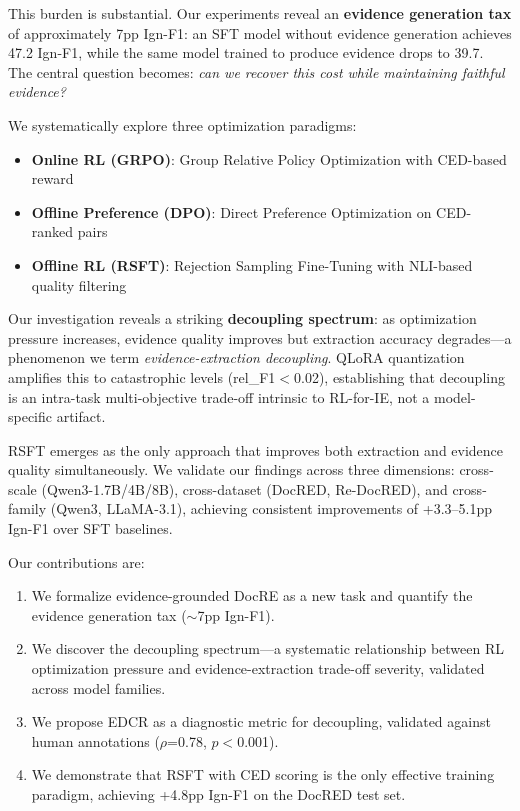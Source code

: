 \documentclass[11pt]{article}
\begin{document}
This burden is substantial. Our experiments reveal an \textbf{evidence generation tax} of approximately 7pp Ign-F1: an SFT model without evidence generation achieves 47.2 Ign-F1, while the same model trained to produce evidence drops to 39.7. The central question becomes: \emph{can we recover this cost while maintaining faithful evidence?}

We systematically explore three optimization paradigms:
\begin{itemize}
\item \textbf{Online RL (GRPO)}: Group Relative Policy Optimization with CED-based reward
\item \textbf{Offline Preference (DPO)}: Direct Preference Optimization on CED-ranked pairs
\item \textbf{Offline RL (RSFT)}: Rejection Sampling Fine-Tuning with NLI-based quality filtering
\end{itemize}

Our investigation reveals a striking \textbf{decoupling spectrum}: as optimization pressure increases, evidence quality improves but extraction accuracy degrades---a phenomenon we term \emph{evidence-extraction decoupling}. QLoRA quantization amplifies this to catastrophic levels (rel\_F1$<$0.02), establishing that decoupling is an intra-task multi-objective trade-off intrinsic to RL-for-IE, not a model-specific artifact.

RSFT emerges as the only approach that improves both extraction and evidence quality simultaneously. We validate our findings across three dimensions: cross-scale (Qwen3-1.7B/4B/8B), cross-dataset (DocRED, Re-DocRED), and cross-family (Qwen3, LLaMA-3.1), achieving consistent improvements of +3.3--5.1pp Ign-F1 over SFT baselines.

Our contributions are:
\begin{enumerate}
\item We formalize evidence-grounded DocRE as a new task and quantify the evidence generation tax ($\sim$7pp Ign-F1).
\item We discover the decoupling spectrum---a systematic relationship between RL optimization pressure and evidence-extraction trade-off severity, validated across model families.
\item We propose EDCR as a diagnostic metric for decoupling, validated against human annotations ($\rho$=0.78, $p<$0.001).
\item We demonstrate that RSFT with CED scoring is the only effective training paradigm, achieving +4.8pp Ign-F1 on the DocRED test set.
\end{enumerate}
\end{document}
